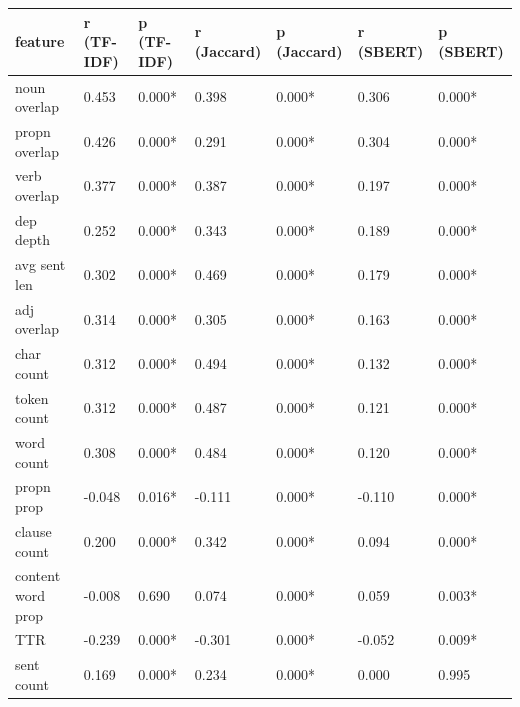 \begin{tabular}{lllllll}
\toprule
feature & r (TF-IDF) & p (TF-IDF) & r (Jaccard) & p (Jaccard) & r (SBERT) & p (SBERT) \\
\midrule
noun overlap & 0.453 & 0.000* & 0.398 & 0.000* & 0.306 & 0.000* \\
propn overlap & 0.426 & 0.000* & 0.291 & 0.000* & 0.304 & 0.000* \\
verb overlap & 0.377 & 0.000* & 0.387 & 0.000* & 0.197 & 0.000* \\
dep depth & 0.252 & 0.000* & 0.343 & 0.000* & 0.189 & 0.000* \\
avg sent len & 0.302 & 0.000* & 0.469 & 0.000* & 0.179 & 0.000* \\
adj overlap & 0.314 & 0.000* & 0.305 & 0.000* & 0.163 & 0.000* \\
char count & 0.312 & 0.000* & 0.494 & 0.000* & 0.132 & 0.000* \\
token count & 0.312 & 0.000* & 0.487 & 0.000* & 0.121 & 0.000* \\
word count & 0.308 & 0.000* & 0.484 & 0.000* & 0.120 & 0.000* \\
propn prop & -0.048 & 0.016* & -0.111 & 0.000* & -0.110 & 0.000* \\
clause count & 0.200 & 0.000* & 0.342 & 0.000* & 0.094 & 0.000* \\
content word prop & -0.008 & 0.690 & 0.074 & 0.000* & 0.059 & 0.003* \\
TTR & -0.239 & 0.000* & -0.301 & 0.000* & -0.052 & 0.009* \\
sent count & 0.169 & 0.000* & 0.234 & 0.000* & 0.000 & 0.995 \\
\bottomrule
\end{tabular}

